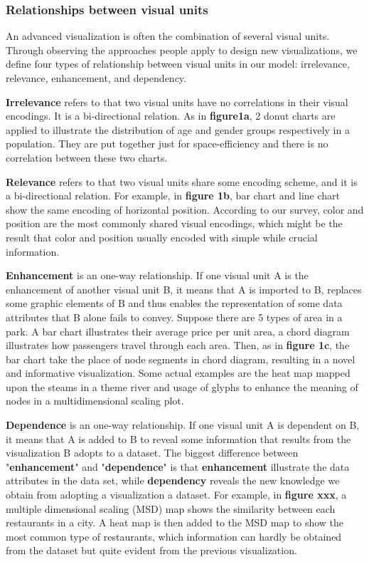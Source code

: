\documentclass[review,journal]{vgtc}         %
\begin{document}
\subsubsection{Relationships between visual units}
An advanced visualization is often the combination of several visual units. Through observing the approaches people apply to design new visualizations, we define four types of relationship between visual units in our model: irrelevance, relevance, enhancement, and dependency. \par
\textbf{Irrelevance} refers to that two visual units have no correlations in their visual encodings. It is a bi-directional relation. As in \textbf{figure1a}, 2 donut charts are applied to illustrate the distribution of age and gender groups respectively in a population. They are put together just for space-efficiency and there is no correlation between these two charts. \par
\textbf{Relevance} refers to that two visual units share some encoding scheme, and it is a bi-directional relation. For example, in \textbf{figure 1b}, bar chart and line chart show the same encoding of horizontal position. According to our survey, color and position are the most commonly shared visual encodings, which might be the result that color and position usually encoded with simple while crucial information. \par
\textbf{Enhancement} is an one-way relationship. If one visual unit A is the enhancement of another visual unit B, it means that A is imported to B, replaces some graphic elements of B and thus enables the representation of some data attributes that B alone fails to convey. Suppose there are 5 types of area in a park. A bar chart illustrates their average price per unit area, a chord diagram illustrates how passengers travel through each area. Then, as in \textbf{figure 1c}, the bar chart take the place of node segments in chord diagram, resulting in a novel and informative visualization. Some actual examples are the heat map mapped upon the steams in a theme river\cite{wu_opinionseer:_2010}  and usage of glyphs to enhance the meaning of nodes in a multidimensional scaling plot.\cite{chen_peakvizor:_2016}\par
\textbf{Dependence} is an one-way relationship. If one visual unit A is dependent on B, it means that A is added to B to reveal some information that results from the visualization B adopts to a dataset. The biggest difference between "\textbf{enhancement}" and "\textbf{dependence}" is that \textbf{enhancement} illustrate the data attributes in the data set, while \textbf{dependency} reveals the new knowledge we obtain from adopting a visualization a dataset. For example, in \textbf{figure xxx}, a multiple dimensional scaling (MSD) map shows the similarity between each restaurants in a city. A heat map is then added to the MSD map to show the most common type of restaurants, which information can hardly be obtained from the dataset but quite evident from the previous visualization. 
\end{document}
